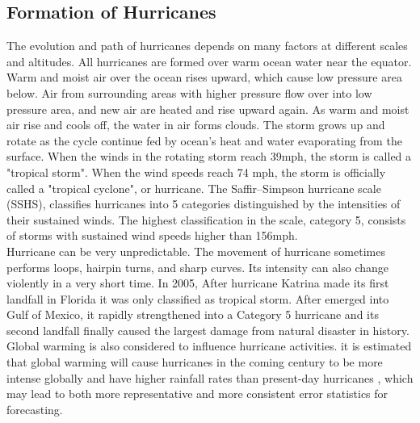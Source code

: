 \subsection{Formation of Hurricanes}
The evolution and path of hurricanes depends on many factors at different scales and altitudes. All hurricanes are formed over warm ocean water near the equator. Warm and moist air over the ocean rises upward, which cause low pressure area below. Air from surrounding areas with higher pressure flow over into low pressure area, and new air are heated and rise upward again. As warm and moist air rise and cools off, the water in air forms clouds. The storm grows up and rotate as the cycle continue fed by ocean's heat and water evaporating from the surface. When the winds in the rotating storm reach 39mph, the storm is called a "tropical storm". When the wind speeds reach 74 mph, the storm is officially called a "tropical cyclone", or hurricane. The Saffir–Simpson hurricane scale (SSHS), classifies hurricanes into 5 categories distinguished by the intensities of their sustained winds. The highest classification in the scale, category 5, consists of storms with sustained wind speeds higher than 156mph.\\
Hurricane can be very unpredictable. The movement of hurricane sometimes performs loops, hairpin turns, and sharp curves. Its intensity can also change violently in a very short time. In 2005, After hurricane Katrina made its first landfall in Florida it was only classified as tropical storm. After emerged into Gulf of Mexico, it rapidly strengthened into a Category 5 hurricane and its second landfall finally caused the largest damage from natural disaster in history. Global warming is also considered to influence hurricane activities. it is estimated that global warming will cause hurricanes in the coming century to be more intense globally and have higher rainfall rates than present-day hurricanes \cite{knutson2013dynamical}, which may lead to both more representative and more consistent error statistics for forecasting.


